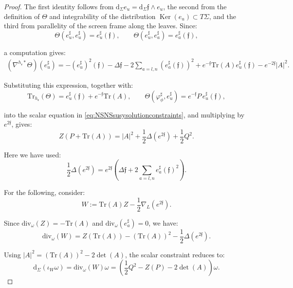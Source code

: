 \documentclass[10pt,reqno,a4paper]{amsart}
\theoremstyle{plain}
\theoremstyle{definition}
\theoremstyle{remark}
\theoremstyle{remark}
\def\dd{\mathrm{d}}
\newcommand{\Tr}{\mathrm{Tr}}
\def\fre{\mathfrak{e}}
\newcommand{\Ker}{\operatorname{Ker}}
\renewcommand{\(}{ (}
\renewcommand{\)}{ )}
\newcommand{\frf}{\mathfrak{f}}
\begin{document}
\begin{proof}
\noindent
The first identity follows from $\dd_{\Sigma}e_u=\dd_{\Sigma}\frf\wedge e_u$, the second from the definition of $\Theta$ and integrability of the distribution $\Ker(e_u)\subset T\Sigma$, and the third from parallelity of the screen frame along the leaves. Since:
\begin{equation*}
\Theta(e_u^{\sharp},e_u^{\sharp})=e_u^{\sharp}(\frf), \qquad \Theta(e_u^{\sharp},e_a^{\sharp})=e_a^{\sharp}(\frf),
\end{equation*}
	
\noindent
a computation gives:
\begin{eqnarray*}
(\nabla^{h_{\fre}\ast}\Theta)(e_u^{\sharp}) = -(e_u^{\sharp})^2(\frf)-\Delta\frf -2\sum_{a=l,n} (e_a^{\sharp}(\frf) )^2 + e^{-\frf}\Tr(A)e_u^{\sharp}(\frf) -e^{-2\frf}\vert A\vert^2.
\end{eqnarray*}
	
\noindent
Substituting this expression, together with:
\begin{equation*}
\Tr_{h_{\fre}}(\Theta) = e_u^{\sharp}(\frf)+e^{-\frf}\Tr(A), \qquad \Theta(\varphi_{\phi}^{\sharp},e_u^{\sharp}) = e^{-\frf}P\,e_u^{\sharp}(\frf),
\end{equation*}
	
\noindent
into the scalar equation in \eqref{eq:NSNSsusysolutionconstraints}, and multiplying by $e^{2\frf}$, gives:
\begin{equation}
\label{eq:compactrigidityscalar} 
Z (P+\Tr(A) ) = \vert A\vert^2 + \frac{1}{2}\Delta(e^{2\frf}) + \frac{1}{2} Q^2.
\end{equation}
	
\noindent
Here we have used:
\begin{equation*}
\frac{1}{2}\Delta(e^{2\frf}) = e^{2\frf} ( \Delta\frf + 2\sum_{a=l,n} e_a^{\sharp}(\frf)^2 ).
\end{equation*}
	
\noindent
For the following, consider:
\begin{equation*}
W := \Tr(A)Z-\frac{1}{2}\nabla_L(e^{2\frf}).
\end{equation*}
	
\noindent
Since $\mathrm{div}_{\omega}(Z)=-\Tr(A)$ and $\mathrm{div}_{\omega}(e_a^{\sharp})=0$, we have:
\begin{equation*}
\mathrm{div}_{\omega}(W) = Z(\Tr(A))-(\Tr(A))^2-\frac{1}{2}\Delta(e^{2\frf}).
\end{equation*}
	
\noindent
Using $\vert A\vert^2=(\Tr(A))^2-2\det(A)$, the scalar constraint reduces to:
\begin{equation}
\label{eq:compactrigidityraychaudhuri}
\dd_{\Sigma}(\iota_W\omega) = \mathrm{div}_{\omega}(W)\omega = (\frac{1}{2}Q^2-Z(P)-2\det(A) )\omega.
\end{equation}


\end{proof}
\end{document}
